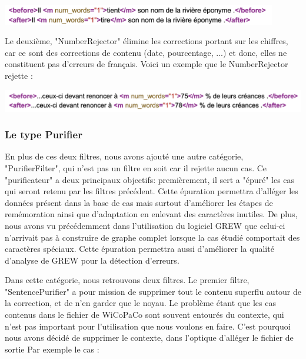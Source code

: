 \documentclass{article}
\begin{document}
\begin{center}
\includegraphics[width=12cm]{exemple12.png} %
\end{center}
Le deuxi\`{e}me, "NumberRejector" \'{e}limine les corrections portant sur les chiffres, car ce sont des corrections de contenu (date, pourcentage, ...) et donc, elles ne constituent pas d'erreurs de fran\c{c}ais. 
Voici un exemple que le NumberRejector rejette :
\begin{center}
\includegraphics[width=14cm]{exemple13.png} %
\end{center}

\subsubsection{Le type Purifier}
En plus de ces deux filtres, nous avons ajout\'{e} une autre cat\'{e}gorie, "PurifierFilter", qui n'est pas un filtre en soit car il rejette aucun cas. Ce "purificateur" a deux principaux objectifs: premi\`{e}rement, il sert a "\'{e}pur\'{e}" les cas qui seront retenu par les filtres pr\'{e}c\'{e}dent. Cette \'{e}puration permettra d'all\'{e}ger les donn\'{e}es pr\'{e}sent dans la base de cas mais surtout d'am\'{e}liorer les \'{e}tapes de rem\'{e}moration ainsi que d'adaptation en enlevant des caract\`{e}res inutiles. De plus, nous avons vu pr\'{e}c\'{e}demment dans l'utilisation du logiciel GREW que celui-ci n'arrivait pas \`{a} construire de graphe complet lorsque la cas \'{e}tudi\'{e} comportait des caract\`{e}res sp\'{e}ciaux. Cette \'{e}puration permettra aussi d'am\'{e}liorer la qualit\'{e} d'analyse de GREW pour la d\'{e}tection d'erreurs.

Dans cette cat\'{e}gorie, nous retrouvons deux filtres. Le premier filtre, "SentencePurifier" a pour mission de supprimer tout le contenu superflu autour de la correction, et de n'en garder que le noyau. Le probl\`{e}me \'{e}tant que les cas contenus dans le fichier de WiCoPaCo sont souvent entour\'{e}s du contexte, qui n'est pas important pour l'utilisation que nous voulons en faire. C'est pourquoi nous avons d\'{e}cid\'{e} de supprimer le contexte, dans l'optique d'all\'{e}ger le fichier de sortie
Par exemple le cas : 
\end{document}
